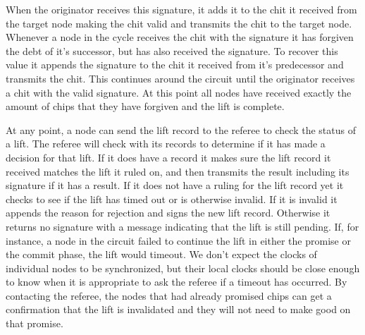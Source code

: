 \documentclass[article, onecolumn, 12pt]{IEEEtran}
\begin{document}
When the originator receives this signature, it adds it to the chit it received from the target node making the chit valid and transmits the chit to the target node. Whenever a node in the cycle receives the chit with the signature it has forgiven the debt of it's successor, but has also received the signature. To recover this value it appends the signature to the chit it received from it's predecessor and transmits the chit. This continues around the circuit until the originator receives a chit with the valid signature. At this point all nodes have received exactly the amount of chips that they have forgiven and the lift is complete.

At any point, a node can send the lift record to the referee to check the status of a lift. The referee will check with its records to determine if it has made a decision for that lift. If it does have a record it makes sure the lift record it received matches the lift it ruled on, and then transmits the result including its signature if it has a result. If it does not have a ruling for the lift record yet it checks to see if the lift has timed out or is otherwise invalid. If it is invalid it appends the reason for rejection and signs the new lift record. Otherwise it returns no signature with a message indicating that the lift is still pending. If, for instance, a node in the circuit failed to continue the lift in either the promise or the commit phase, the lift would timeout. We don't expect the clocks of individual nodes to be synchronized, but their local clocks should be close enough to know when it is appropriate to ask the referee if a timeout has occurred. By contacting the referee, the nodes that had already promised chips can get a confirmation that the lift is invalidated and they will not need to make good on that promise.


\end{document}
